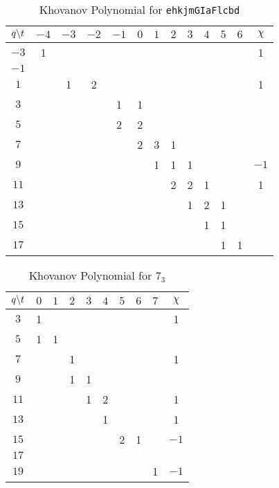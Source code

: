 \documentclass{article}
\theoremstyle{plain}
\begin{document}
        \begin{table}
            \centering
            \begin{tabular}{| c | c | c | c | c | c | c | c | c | c | c | c | c |}
                \hline
                $q\symbol{92}t$&$-4$&$-3$&$-2$&$-1$&$0$&$1$&$2$&$3$&$4$&$5$&$6$&$\chi$\\
                \hline
                $-3$&1&&&&&&&&&&&1\\
                \hline
                $-1$&&&&&&&&&&&&\\
                \hline
                $1$&&1&2&&&&&&&&&1\\
                \hline
                $3$&&&&1&1&&&&&&&\\
                \hline
                $5$&&&&2&2&&&&&&&\\
                \hline
                $7$&&&&&2&3&1&&&&&\\
                \hline
                $9$&&&&&&1&1&1&&&&$-1$\\
                \hline
                $11$&&&&&&&2&2&1&&&1\\
                \hline
                $13$&&&&&&&&1&2&1&&\\
                \hline
                $15$&&&&&&&&&1&1&&\\
                \hline
                $17$&&&&&&&&&&1&1&\\
                \hline
            \end{tabular}
            \caption{Khovanov Polynomial for \texttt{ehkjmGIaFlcbd}}
        \end{table}
        \begin{table}
            \centering
            \begin{tabular}{| c | c | c | c | c | c | c | c | c | c |}
                \hline
                $q\symbol{92}t$&$0$&$1$&$2$&$3$&$4$&$5$&$6$&$7$&$\chi$\\
                \hline
                $3$&1&&&&&&&&1\\
                \hline
                $5$&1&1&&&&&&&\\
                \hline
                $7$&&&1&&&&&&1\\
                \hline
                $9$&&&1&1&&&&&\\
                \hline
                $11$&&&&1&2&&&&1\\
                \hline
                $13$&&&&&1&&&&1\\
                \hline
                $15$&&&&&&2&1&&$-1$\\
                \hline
                $17$&&&&&&&&&\\
                \hline
                $19$&&&&&&&&1&$-1$\\
                \hline
            \end{tabular}
            \caption{Khovanov Polynomial for $7_{3}$}
        \end{table}
\end{document}
